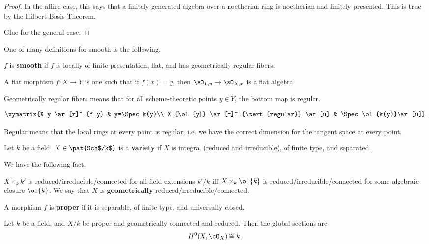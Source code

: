 \begin{proof}
In the affine case, this says that a finitely generated algebra over a noetherian ring is noetherian and finitely presented. This is true by the Hilbert Basis Theorem.

Glue for the general case.
\end{proof}
One of many definitions for smooth is the following.
\begin{df}
$f$ is \textbf{smooth} if $f$ is locally of finite presentation, flat, and has geometrically regular fibers. 

A flat morphism $f:X\to Y$ is one such that if $f(x)=y$, then $\sO_{Y,y}\to \sO_{X,x}$ is a flat algebra.

Geometrically regular fibers means that for all scheme-theoretic points $y\in Y$, %
the bottom map is regular.

\[
\xymatrix{X_y \ar[r]^-{f_y} & y=\Spec k(y)\\
X_{\ol{y}} \ar[r]^-{\text{regular}} \ar[u] & \Spec \ol{k(y)}\ar[u]}
\]

Regular means that the local rings at every point is regular, i.e. we have the correct dimension for the tangent space at every point.  %
\end{df}
\begin{df}
Let $k$ be a field. $X\in \pat{Sch$/k$}$ is a \textbf{variety} if $X$ is integral (reduced and irreducible), of finite type, and separated.
\end{df}

We have the following fact.
\begin{fct}
$X\times_k k'$ is reduced/irreducible/connected for all field extensions $k'/k$ iff $X\times_k\ol{k}$ is reduced/irreducible/connected for some algebraic closure $\ol{k}$. We say that $X$ is \textbf{geometrically} reduced/irreducible/connected.
\end{fct}
\begin{df}
A morphism $f$ is \textbf{proper} if it is separable, of finite type, and universally closed.
\end{df}
\begin{fct}
Let $k$ be a field, and $X/k$ be proper and geometrically connected and reduced. Then the global sections are
\[H^0(X,\cO_X)\cong k.\]
\end{fct}
